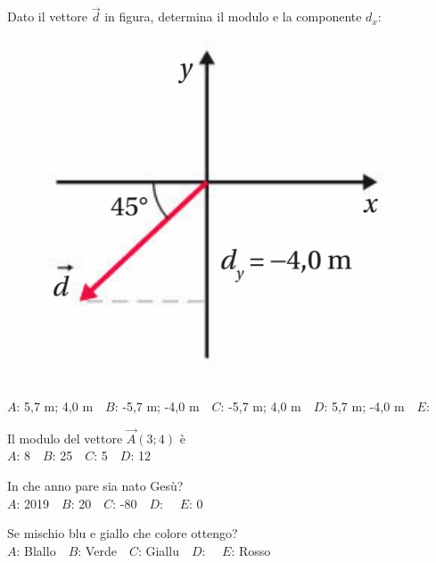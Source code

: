 \mcquestionfooter



\def\mcquestionnumber{9}


\mcquestionheader Dato il vettore $\vec{d}$ in figura, determina il modulo e la componente $d_x$: \begin{figure}[h!]   \begin{center}     \includegraphics[scale=0.35]{vettored.png}   \end{center} \end{figure}\\
{$A$}: 5,7 m; 4,0 m\ \ {$B$}: -5,7 m; -4,0 m\ \ {$C$}: -5,7 m; 4,0 m\ \ {$D$}: 5,7 m; -4,0 m\ \ {$E$}: \ \ 

\mcquestionfooter



\def\mcquestionnumber{10}


\mcquestionheader Il modulo del vettore $\vec{A}(3;4)$ è\\
{$A$}: 8\ \ {$B$}: 25\ \ {$C$}: 5\ \ {$D$}: 12\ \ 

\mcquestionfooter



\def\mcquestionnumber{11}


\mcquestionheader In che anno pare sia nato Gesù?\\
{$A$}: 2019\ \ {$B$}: 20\ \ {$C$}: -80\ \ {$D$}: \ \ {$E$}: 0\ \ 

\mcquestionfooter



\def\mcquestionnumber{12}


\mcquestionheader Se mischio blu e giallo che colore ottengo?\\
{$A$}: Blallo\ \ {$B$}: Verde\ \ {$C$}: Giallu\ \ {$D$}: \ \ {$E$}: Rosso\ \ 

